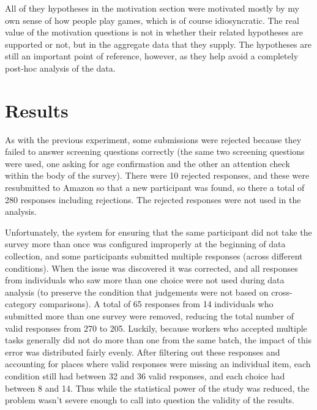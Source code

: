 All of they hypotheses in the motivation section were motivated mostly by my own sense of how people play games, which is of course idiosyncratic.
%
The real value of the motivation questions is not in whether their related hypotheses are supported or not, but in the aggregate data that they supply.
%
The hypotheses are still an important point of reference, however, as they help avoid a completely post-hoc analysis of the data.

\section{Results}

As with the previous experiment, some submissions were rejected because they failed to answer screening questions correctly (the same two screening questions were used, one asking for age confirmation and the other an attention check within the body of the survey).
%
There were 10 rejected responses, and these were resubmitted to Amazon so that a new participant was found, so there a total of 280 responses including rejections.
%
The rejected responses were not used in the analysis.


Unfortunately, the system for ensuring that the same participant did not take the survey more than once was configured improperly at the beginning of data collection, and some participants submitted multiple responses (across different conditions).
%
When the issue was discovered it was corrected, and all responses from individuals who saw more than one choice were not used during data analysis (to preserve the condition that judgements were not based on cross-category comparisons).
%
A total of 65 responses from 14 individuals who submitted more than one survey were removed, reducing the total number of valid responses from 270 to 205.
%
Luckily, because workers who accepted multiple tasks generally did not do more than one from the same batch, the impact of this error was distributed fairly evenly.
%
After filtering out these responses and accounting for places where valid responses were missing an individual item, each condition still had between 32 and 36 valid responses, and each choice had between 8 and 14.
%
Thus while the statistical power of the study was reduced, the problem wasn't severe enough to call into question the validity of the results.


